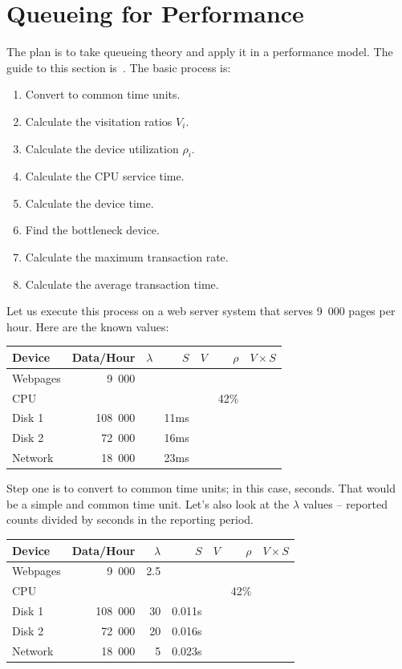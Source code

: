 \section*{Queueing for Performance}

The plan is to take queueing theory and apply it in a performance model. The guide to this section is~\cite{williams-perf}. The basic process is:

\begin{enumerate}[noitemsep]
	\item Convert to common time units.
	\item Calculate the visitation ratios $V_{i}$.
	\item Calculate the device utilization $\rho_{i}$.
	\item Calculate the CPU service time.
	\item Calculate the device time.
	\item Find the bottleneck device.
	\item Calculate the maximum transaction rate.
	\item Calculate the average transaction time.
\end{enumerate}

\newpage
Let us execute this process on a web server system that serves 9~000 pages per hour. Here are the known values:

\begin{center}
\begin{tabular}{l|r|r|r|r|r|r} 
	\textbf{Device} & \textbf{Data/Hour} & \textbf{$\lambda$} & \textbf{$S$} & \textbf{$V$} & \textbf{$\rho$} & \textbf{$V \times S$} \\ \hline
	Webpages & 9~000 & & & & & \\ \hline
	CPU & & & & &  42\% & \\ \hline
	Disk 1 & 108~000 & & 11ms & & &\\ \hline
	Disk 2 & 72~000 & & 16ms & & &\\ \hline
	Network & 18~000 & & 23ms & & &
\end{tabular}
\end{center}

Step one is to convert to common time units; in this case, seconds. That would be a simple and common time unit. Let's also look at the $\lambda$ values -- reported counts divided by seconds in the reporting period.

\begin{center}
\begin{tabular}{l|r|r|r|r|r|r} 
	\textbf{Device} & \textbf{Data/Hour} & \textbf{$\lambda$} & \textbf{$S$} & \textbf{$V$} & \textbf{$\rho$} & \textbf{$V \times S$} \\ \hline
	Webpages & 9~000 & 2.5 & & & & \\ \hline
	CPU & & & & & 42\% & \\ \hline
	Disk 1 & 108~000 & 30 & 0.011s  & & &\\ \hline
	Disk 2 & 72~000 & 20 & 0.016s & & &\\ \hline
	Network & 18~000 & 5 & 0.023s & & &
\end{tabular}
\end{center}

